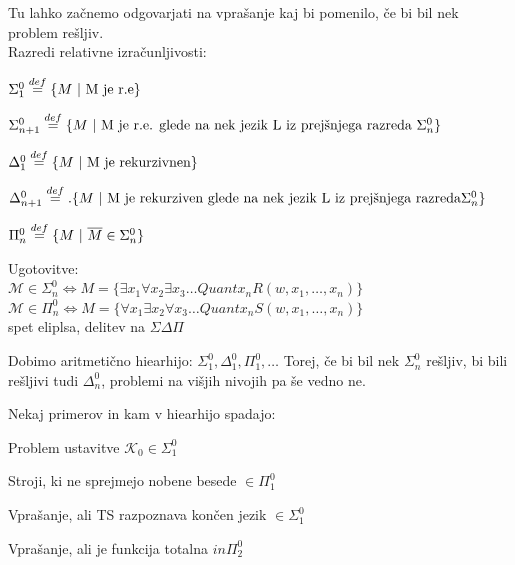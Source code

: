 \documentclass[10pt,a4paper,oneside]{book}
\begin{document}
\begin{neurejeno}
\br
Tu lahko začnemo odgovarjati na vprašanje kaj bi pomenilo, če bi bil nek problem rešljiv.\\
Razredi relativne izračunljivosti:
\begin{items}
\item $\Sigma_1^0 \overset{def}{=} \{ M\ |\ \mbox{M je r.e}\}$
\item $\Sigma_{n+1}^0 \overset{def}{=} \{ M\ |\ \mbox{M je r.e. glede na nek jezik L iz prejšnjega razreda } \Sigma_n^0\}$
\item $\Delta_1^0 \overset{def}{=} \{ M\ |\ \mbox{M je rekurzivnen} \}$
\item $\Delta_{n+1}^0 \overset{def}{=}. \{ M\ |\ \mbox{M je rekurziven glede na nek jezik L iz prejšnjega razreda} \Sigma_n^0\}$%
\item $\Pi_n^0 \overset{def}{=} \{ M\ |\ \overline{M} \in \Sigma_n^0 \}$
\end{items}

Ugotovitve:\\%
$\mathcal{M} \in \Sigma_n^0 \Longleftrightarrow M=\{ \exists x_1 \forall x_2 \exists x_3 \dots Quant x_n R(w, x_1,\dots,x_n)\}$\\ %
$\mathcal{M} \in \Pi_n^0 \Longleftrightarrow M=\{ \forall x_1 \exists x_2 \forall x_3 \dots Quant x_n S(w, x_1,\dots,x_n)\}$\\ %
\fixme spet eliplsa, delitev na $\Sigma \Delta \Pi$

Dobimo aritmetično hiearhijo: $\Sigma_1^0, \Delta_1^0, \Pi_1^0, \dots$
Torej, če bi bil nek $\Sigma_n^0$ rešljiv, bi bili rešljivi tudi $\Delta_n^0$, problemi na višjih nivojih pa še vedno ne.

Nekaj primerov in kam v hiearhijo spadajo:
\begin{items}
\item Problem ustavitve $\mathcal{K}_0 \in \Sigma_1^0$
\item Stroji, ki ne sprejmejo nobene besede $\in \Pi_1^0$
\item Vprašanje, ali TS razpoznava končen jezik $\in \Sigma_1^0$
\item Vprašanje, ali je funkcija totalna $in \Pi_2^0$
\end{items}


\end{neurejeno}
\end{document}
